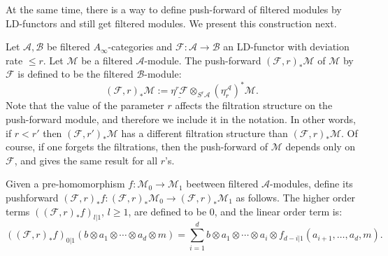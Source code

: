 At the same time, there is a way to define push-forward of filtered
modules by LD-functors and still get filtered modules. We present this
construction next.

Let $\mathcal{A}, \mathcal{B}$ be filtered $A_{\infty}$-categories and
$\mathcal{F}: \mathcal{A} \longrightarrow \mathcal{B}$ an LD-functor
with deviation rate $\leq r$. Let $\mathcal{M}$ be a filtered
$\mathcal{A}$-module. The push-forward $(\mathcal{F},r)_* \mathcal{M}$
of $\mathcal{M}$ by $\mathcal{F}$ is defined to be the filtered
$\mathcal{B}$-module:
\begin{equation} \label{eq:psh-m} (\mathcal{F},r)_* \mathcal{M} :=
  \underline{\eta^r \mathcal{F}} \otimes_{S^r \mathcal{A}}
  (\eta_r^{\mathcal{A}})^* \mathcal{M}.
\end{equation}
Note that the value of the parameter $r$ affects the filtration
structure on the push-forward module, and therefore we include it in
the notation. In other words, if $r < r'$ then
$(\mathcal{F},r')_* \mathcal{M}$ has a different filtration structure
than $(\mathcal{F},r)_* \mathcal{M}$. Of course, if one forgets the
filtrations, then the push-forward of $\mathcal{M}$ depends only on
$\mathcal{F}$, and gives the same result for all $r$'s.

Given a pre-homomorphism
$f : \mathcal{M}_0 \longrightarrow \mathcal{M}_1$ beetween filtered
$\mathcal{A}$-modules, define its pushforward
$(\mathcal{F},r)_* f : (\mathcal{F},r)_* \mathcal{M}_0 \longrightarrow
(\mathcal{F},r)_* \mathcal{M}_1$ as follows. The higher order terms
$((\mathcal{F}, r)_*f)_{l|1}$, $l \geq 1$, are defined to be $0$, and
the linear order term is:
$$((\mathcal{F}, r)_*f)_{0|1}
(b\otimes a_1\otimes \cdots \otimes a_d\otimes m)= \sum_{i=1}^d
b\otimes a_1\otimes \cdots \otimes a_i\otimes
f_{d-i|1}(a_{i+1},\ldots, a_d,m).$$

